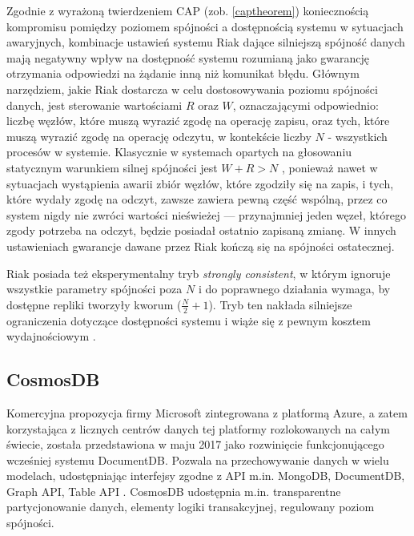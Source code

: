 Zgodnie z wyrażoną twierdzeniem CAP (zob. \ref{captheorem}) koniecznością kompromisu pomiędzy poziomem spójności a dostępnością systemu w sytuacjach awaryjnych, kombinacje ustawień systemu Riak dające silniejszą spójność danych mają negatywny wpływ na dostępność systemu rozumianą jako gwarancję otrzymania odpowiedzi na żądanie inną niż komunikat błędu. Głównym narzędziem, jakie Riak dostarcza w celu dostosowywania poziomu spójności danych, jest sterowanie wartościami $R$ oraz $W$, oznaczającymi odpowiednio: liczbę węzłów, które muszą wyrazić zgodę na operację zapisu, oraz tych, które muszą wyrazić zgodę na operację odczytu, w kontekście liczby $N$ - wszystkich procesów w systemie. Klasycznie w systemach opartych na głosowaniu statycznym warunkiem silnej spójności jest $W + R > N$ \cite{goldw89}, ponieważ nawet w sytuacjach wystąpienia awarii zbiór węzłów, które zgodziły się na zapis, i tych, które wydały zgodę na odczyt, zawsze zawiera pewną część wspólną, przez co system nigdy nie zwróci wartości nieświeżej --- przynajmniej jeden węzeł, którego zgody potrzeba na odczyt, będzie posiadał ostatnio zapisaną zmianę. W innych ustawieniach gwarancje dawane przez Riak kończą się na spójności ostatecznej.

Riak posiada też eksperymentalny tryb \textit{strongly consistent}, w którym ignoruje wszystkie parametry spójności poza $N$ i do poprawnego działania wymaga, by dostępne repliki tworzyły kworum ($\frac{N}{2} + 1$). Tryb ten nakłada silniejsze ograniczenia dotyczące dostępności systemu i wiąże się z pewnym kosztem wydajnościowym \cite{riakstrongref}.

\subsection{CosmosDB}

Komercyjna propozycja firmy Microsoft zintegrowana z platformą Azure, a zatem korzystająca z licznych centrów danych tej platformy rozlokowanych na całym świecie, została przedstawiona w maju 2017 jako rozwinięcie funkcjonującego wcześniej systemu DocumentDB. Pozwala na przechowywanie danych w wielu modelach, udostępniając interfejsy zgodne z API m.in. MongoDB, DocumentDB, Graph API, Table API \cite{cosmos1}. CosmosDB udostępnia m.in. transparentne partycjonowanie danych, elementy logiki transakcyjnej, regulowany poziom spójności.

